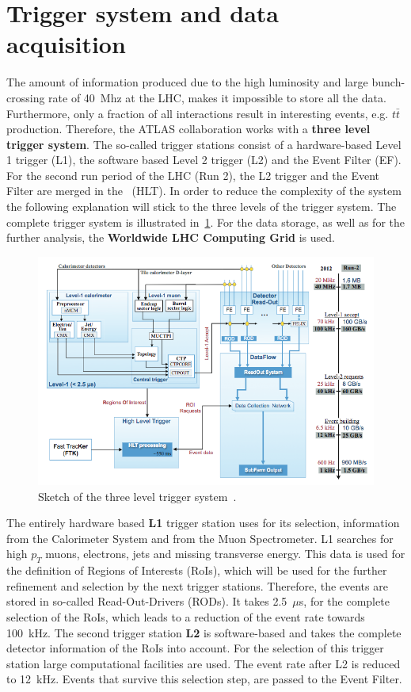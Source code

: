 \section{Trigger system and data acquisition}


 The amount of information produced due to the  high luminosity and large bunch-crossing rate of 40~Mhz at the LHC, makes it impossible to store all the data. Furthermore, only a fraction of all interactions result in interesting events, e.g. $t\bar{t}$ production. Therefore, the ATLAS collaboration works with a \textbf{three level trigger system}. The so-called trigger stations consist of a hardware-based Level 1 trigger (L1), the software based Level 2 trigger (L2) and the Event Filter (EF). For the second run period of the LHC (Run 2), the L2 trigger and the Event Filter are merged in  the~ (HLT). In order to reduce the complexity of the system the following explanation will stick to the three levels of the trigger system. The complete trigger system is illustrated in~\cref{fig:38}. For the data storage, as well as for the further analysis, the \textbf{Worldwide LHC Computing Grid} is used.

\begin{figure}[t]
	\centering
	\includegraphics[width=0.80\linewidth]{trigger}
	\caption{Sketch of the three level trigger system~\cite{Nakahama:2015211}.} 
	\label{fig:38}
\end{figure}


 The entirely hardware based \textbf{L1} trigger station uses for its selection, information from the Calorimeter System and from the Muon Spectrometer. L1 searches for high $p_T$ muons, electrons, jets and missing transverse energy. This data is used for the definition of Regions of Interests (RoIs), which will be used for the further refinement and selection by the next trigger stations. Therefore, the events are stored in so-called Read-Out-Drivers (RODs). It takes 2.5~$\mu$s, for the complete selection of the RoIs, which leads to a reduction of the event rate towards 100~kHz. The second trigger station \textbf{L2} is software-based and takes the complete detector information of the RoIs into account. For the selection of this trigger station large computational facilities are used. The event rate after L2 is reduced to 12~kHz. 
Events that survive this selection step, are passed to the Event Filter.

